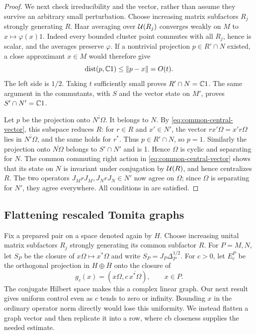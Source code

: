 \begin{proof}
We next check irreducibility and the vector, rather than assume they
survive an arbitrary small perturbation.  Choose increasing matrix
subfactors $R_j$ strongly generating $R$.  Haar averaging over
$\mathcal U(R_j)$ converges weakly on $M$ to $x\mapsto\varphi(x)1$.
Indeed every bounded cluster point commutes with all $R_j$, hence is
scalar, and the averages preserve $\varphi$.  If a nontrivial projection
$p\in R'\cap N$ existed, a close approximant $x\in M$ would therefore
give
\[
 \operatorname{dist}(p,\mathbb C1)\leq\lVert p-x\rVert=O(t).
\]
The left side is $1/2$.  Taking $t$ sufficiently small proves
$R'\cap N=\mathbb C1$.  The same argument in the commutants, with $S$ and
the vector state on $M'$, proves $S'\cap N'=\mathbb C1$.

Let $p$ be the projection onto $\overline{N'\Omega}$.  It belongs to
$N$.  By \eqref{eq:common-central-vector}, this subspace reduces $R$:
for $r\in R$ and $x'\in N'$, the vector $rx'\Omega=x'r\Omega$ lies
in $\overline{N'\Omega}$, and the same holds for $r^*$.
Thus $p\in R'\cap N$, so $p=1$.  Similarly the projection onto
$\overline{N\Omega}$ belongs to $S'\cap N'$ and is 1.  Hence
$\Omega$ is cyclic and separating for $N$.  The common commuting
right action in \eqref{eq:common-central-vector} shows that its state
on $N$ is invariant under conjugation by $\mathcal U(R)$, and hence centralizes
$R$.  The two operators $J_MrJ_M,J_NrJ_N\in N'$ now agree on
$\Omega$; since $\Omega$ is separating for $N'$, they agree everywhere.
All conditions in  are satisfied.
\end{proof}

\subsection{Flattening rescaled Tomita graphs}

Fix a prepared pair on a space denoted again by $H$. Choose increasing
unital matrix subfactors $R_j$ strongly generating its common subfactor $R$.
For $P=M,N$,
let $S_P$ be the closure of $x\Omega\mapsto x^*\Omega$ and write
$S_P=J_P\Delta_P^{1/2}$.  For $c>0$, let $E_c^P$ be the orthogonal
projection in $H\oplus\overline H$ onto the closure of
\begin{equation}
 g_c(x)=(x\Omega,c\,\overline{x^*\Omega}),\qquad x\in P.
 \label{eq:rescaled-graph}
\end{equation}
The conjugate Hilbert space makes this a complex linear graph.
Our next result gives uniform control even as $c$ tends to zero or
infinity.  Bounding $x$ in the ordinary operator norm directly would
lose this uniformity.  We instead flatten a graph vector and then
replicate it into a row, where cb closeness supplies the needed estimate.

